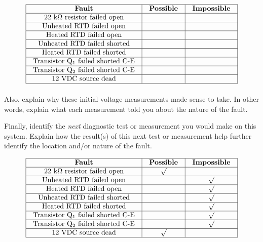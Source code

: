 $$\vbox{\offinterlineskip
\halign{\strut
\vrule \quad\hfil # \ \hfil & 
\vrule \quad\hfil # \ \hfil & 
\vrule \quad\hfil # \ \hfil \vrule \cr
\noalign{\hrule}
%
{\bf Fault} & {\bf Possible} & {\bf Impossible} \cr
%
\noalign{\hrule}
%
22 k$\Omega$ resistor failed open &  &  \cr
%
\noalign{\hrule}
%
Unheated RTD failed open &  &  \cr
%
\noalign{\hrule}
%
Heated RTD failed open &  &  \cr
%
\noalign{\hrule}
%
Unheated RTD failed shorted &  &  \cr
%
\noalign{\hrule}
%
Heated RTD failed shorted &  &  \cr
%
\noalign{\hrule}
%
Transistor Q$_1$ failed shorted C-E &  &  \cr
%
\noalign{\hrule}
%
Transistor Q$_2$ failed shorted C-E &  &  \cr
%
\noalign{\hrule}
%
12 VDC source dead &  &  \cr
%
\noalign{\hrule}
} %
}$$ %

Also, explain why these initial voltage measurements made sense to take.  In other words, explain what each measurement told you about the nature of the fault.  

Finally, identify the {\it next} diagnostic test or measurement you would make on this system.  Explain how the result(s) of this next test or measurement help further identify the location and/or nature of the fault.















$$\vbox{\offinterlineskip
\halign{\strut
\vrule \quad\hfil # \ \hfil & 
\vrule \quad\hfil # \ \hfil & 
\vrule \quad\hfil # \ \hfil \vrule \cr
\noalign{\hrule}
%
{\bf Fault} & {\bf Possible} & {\bf Impossible} \cr
%
\noalign{\hrule}
%
22 k$\Omega$ resistor failed open & $\surd$ &  \cr
%
\noalign{\hrule}
%
Unheated RTD failed open &  & $\surd$ \cr
%
\noalign{\hrule}
%
Heated RTD failed open &  & $\surd$ \cr
%
\noalign{\hrule}
%
Unheated RTD failed shorted &  & $\surd$ \cr
%
\noalign{\hrule}
%
Heated RTD failed shorted &  & $\surd$ \cr
%
\noalign{\hrule}
%
Transistor Q$_1$ failed shorted C-E &  & $\surd$ \cr
%
\noalign{\hrule}
%
Transistor Q$_2$ failed shorted C-E &  & $\surd$ \cr
%
\noalign{\hrule}
%
12 VDC source dead & $\surd$ &  \cr
%
\noalign{\hrule}
} %
}$$ %

